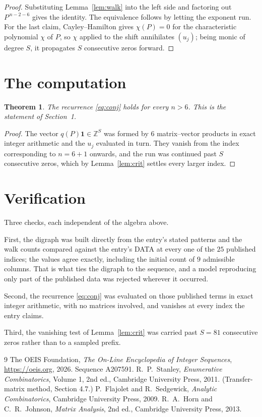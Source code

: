 \documentclass[11pt,a4paper]{article}
\theoremstyle{plain}
\newtheorem{theorem}{Theorem}
\theoremstyle{definition}
\begin{document}
\begin{proof}
Substituting Lemma~\ref{lem:walk} into the left side and factoring out
$P^{\,n-2-6}$ gives the identity. The equivalence follows by letting the exponent
run. For the last claim, Cayley--Hamilton gives $\chi(P)=0$ for the characteristic
polynomial $\chi$ of $P$, so $\chi$ applied to the shift annihilates $(u_j)$; being monic of
degree $S$, it propagates $S$ consecutive zeros forward.
\end{proof}

\section{The computation}

\begin{theorem}
The recurrence \eqref{eq:conj} holds for every $n>6$. This is the statement of
Section~1.
\end{theorem}

\begin{proof}
The vector $q(P)\mathbf{1}\in\mathbb{Z}^{S}$ was formed by $6$ matrix--vector
products in exact integer arithmetic and the $u_j$ evaluated in turn. They vanish from the
index corresponding to $n=6+1$ onwards, and the run was continued past $S$ consecutive
zeros, which by Lemma~\ref{lem:crit} settles every larger index.
\end{proof}

\section{Verification}

Three checks, each independent of the algebra above.

First, the digraph was built directly from the entry's stated patterns and the walk counts
compared against the entry's DATA at every one of the $25$ published indices; the
values agree exactly, including the initial count of $9$ admissible columns. That is
what ties the digraph to the sequence, and a model reproducing only part of the published
data was rejected wherever it occurred.

Second, the recurrence \eqref{eq:conj} was evaluated on those published terms in exact
integer arithmetic, with no matrices involved, and vanishes at every index the entry claims.

Third, the vanishing test of Lemma~\ref{lem:crit} was carried past $S=81$ consecutive
zeros rather than to a sampled prefix.

\begin{thebibliography}{9}
 The OEIS Foundation, \emph{The On-Line Encyclopedia of Integer
Sequences}, \url{https://oeis.org}, 2026. Sequence A207591.
 R.~P.~Stanley, \emph{Enumerative Combinatorics}, Volume 1, 2nd ed.,
Cambridge University Press, 2011. (Transfer-matrix method, Section 4.7.)
 P.~Flajolet and R.~Sedgewick, \emph{Analytic Combinatorics}, Cambridge
University Press, 2009.
 R.~A.~Horn and C.~R.~Johnson, \emph{Matrix Analysis}, 2nd ed., Cambridge
University Press, 2013.
\end{thebibliography}
\end{document}
